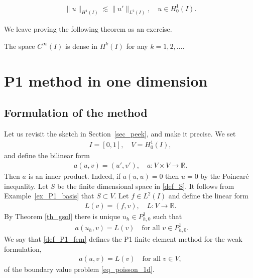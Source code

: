 \documentclass[12pt,oneside,final]{amsart}
\def\R{\mathbb R}
\begin{document}
\begin{proposition}\label{prop_poincare}
    \begin{align*}
\|u\|_{H^1(I)} \lesssim \|u'\|_{L^2(I)}, \quad u \in H_0^1(I).
    \end{align*}
\end{proposition}

We leave proving the following theorem as an exercise.  

\begin{theorem}[Density in $H^k$]\label{th_density_H2}
The space $C^\infty(I)$ is dense in $H^k(I)$ for any $k=1,2,\dots$.
\end{theorem}

\section{P1 method in one dimension}

\subsection{Formulation of the method}

Let us revisit the sketch in Section~\ref{sec_peek}, and make it precise.
We set 
    \begin{align*}
I = [0,1], \quad V = H_0^1(I),
    \end{align*}
and define the bilinear form
    \begin{align*}
a(u, v) = (u', v'), \quad a : V \times V \to \mathbb R.
    \end{align*}
Then $a$ is an inner product. Indeed,
if $a(u,u) = 0$ then $u=0$ by the Poincar\'e inequality.
Let $S$ be the finite dimensional space in \eqref{def_S}.
It follows from Example~\ref{ex_P1_basis} that $S \subset V$.
Let $f \in L^2(I)$ and define the linear form
    \begin{align*}
L(v) = (f, v), \quad L : V \to \R.
    \end{align*}
By Theorem \ref{th_gsol} there is unique $u_h \in P_{h,0}^1$ such that 
    \begin{align}\label{def_P1_fem}
\ \,
a(u_h,v) = L(v) \quad \text{for all $v \in P_{h,0}^1$}.
    \end{align}
We say that \eqref{def_P1_fem} defines the P1 finite element method for the weak formulation,
    \begin{align}\label{def_weak_form}
a(u, v) = L(v) \quad \text{for all $v \in V$},
    \end{align}
of the boundary value problem \eqref{eq_poisson_1d}.
\end{document}
